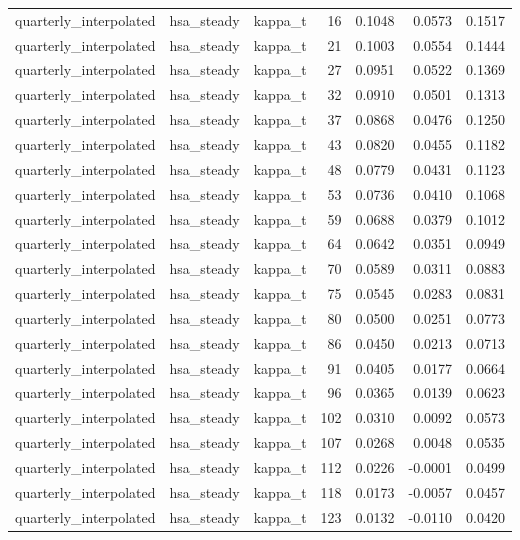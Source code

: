 \begin{tabular}{lllrrrr}
quarterly\_interpolated & hsa\_steady & kappa\_t & 16 & 0.1048 & 0.0573 & 0.1517 \\
quarterly\_interpolated & hsa\_steady & kappa\_t & 21 & 0.1003 & 0.0554 & 0.1444 \\
quarterly\_interpolated & hsa\_steady & kappa\_t & 27 & 0.0951 & 0.0522 & 0.1369 \\
quarterly\_interpolated & hsa\_steady & kappa\_t & 32 & 0.0910 & 0.0501 & 0.1313 \\
quarterly\_interpolated & hsa\_steady & kappa\_t & 37 & 0.0868 & 0.0476 & 0.1250 \\
quarterly\_interpolated & hsa\_steady & kappa\_t & 43 & 0.0820 & 0.0455 & 0.1182 \\
quarterly\_interpolated & hsa\_steady & kappa\_t & 48 & 0.0779 & 0.0431 & 0.1123 \\
quarterly\_interpolated & hsa\_steady & kappa\_t & 53 & 0.0736 & 0.0410 & 0.1068 \\
quarterly\_interpolated & hsa\_steady & kappa\_t & 59 & 0.0688 & 0.0379 & 0.1012 \\
quarterly\_interpolated & hsa\_steady & kappa\_t & 64 & 0.0642 & 0.0351 & 0.0949 \\
quarterly\_interpolated & hsa\_steady & kappa\_t & 70 & 0.0589 & 0.0311 & 0.0883 \\
quarterly\_interpolated & hsa\_steady & kappa\_t & 75 & 0.0545 & 0.0283 & 0.0831 \\
quarterly\_interpolated & hsa\_steady & kappa\_t & 80 & 0.0500 & 0.0251 & 0.0773 \\
quarterly\_interpolated & hsa\_steady & kappa\_t & 86 & 0.0450 & 0.0213 & 0.0713 \\
quarterly\_interpolated & hsa\_steady & kappa\_t & 91 & 0.0405 & 0.0177 & 0.0664 \\
quarterly\_interpolated & hsa\_steady & kappa\_t & 96 & 0.0365 & 0.0139 & 0.0623 \\
quarterly\_interpolated & hsa\_steady & kappa\_t & 102 & 0.0310 & 0.0092 & 0.0573 \\
quarterly\_interpolated & hsa\_steady & kappa\_t & 107 & 0.0268 & 0.0048 & 0.0535 \\
quarterly\_interpolated & hsa\_steady & kappa\_t & 112 & 0.0226 & -0.0001 & 0.0499 \\
quarterly\_interpolated & hsa\_steady & kappa\_t & 118 & 0.0173 & -0.0057 & 0.0457 \\
quarterly\_interpolated & hsa\_steady & kappa\_t & 123 & 0.0132 & -0.0110 & 0.0420 \\

\end{tabular}
